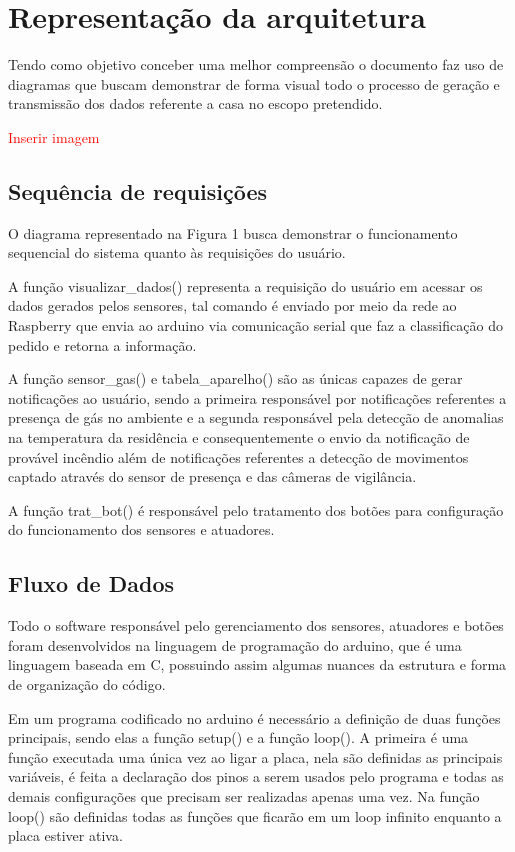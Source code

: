 \section{Representação da arquitetura}
\par Tendo como objetivo conceber uma melhor compreensão o documento faz uso de diagramas que buscam demonstrar de forma visual todo o processo de geração e transmissão dos dados referente a casa no escopo pretendido.

\textcolor{red}{Inserir imagem}

\subsection{Sequência de requisições}

\par O diagrama representado na Figura 1 busca demonstrar o funcionamento sequencial do sistema quanto às requisições do usuário.
\par A função visualizar_dados() representa a requisição do usuário em acessar os dados gerados pelos sensores, tal comando é enviado por meio da rede ao Raspberry que envia ao arduino via comunicação serial que faz a classificação do pedido e retorna a informação.
\par A função sensor_gas() e tabela_aparelho() são as únicas capazes de gerar notificações ao usuário, sendo a primeira responsável por notificações referentes a presença de gás no ambiente e a segunda responsável pela detecção de anomalias na temperatura da residência e consequentemente o envio da notificação de provável incêndio além de notificações referentes a detecção de movimentos captado através do sensor de presença e das câmeras de vigilância.
\par A função trat_bot() é responsável pelo tratamento dos botões para configuração do funcionamento dos sensores e atuadores.

\subsection{Fluxo de Dados}

\par Todo o software responsável pelo gerenciamento dos sensores, atuadores e botões foram desenvolvidos na linguagem de programação do arduino, que é uma linguagem baseada em C, possuindo assim algumas nuances da estrutura e forma de organização do código.
\par Em um programa codificado no arduino é necessário a definição de duas funções principais, sendo elas a função setup() e a função loop(). A primeira é uma função executada uma única vez ao ligar a placa, nela são definidas as principais variáveis, é feita a declaração dos pinos a serem usados pelo programa e todas as demais configurações que precisam ser realizadas apenas uma vez. Na função loop() são definidas todas as funções que ficarão em um loop infinito enquanto a placa estiver ativa.

